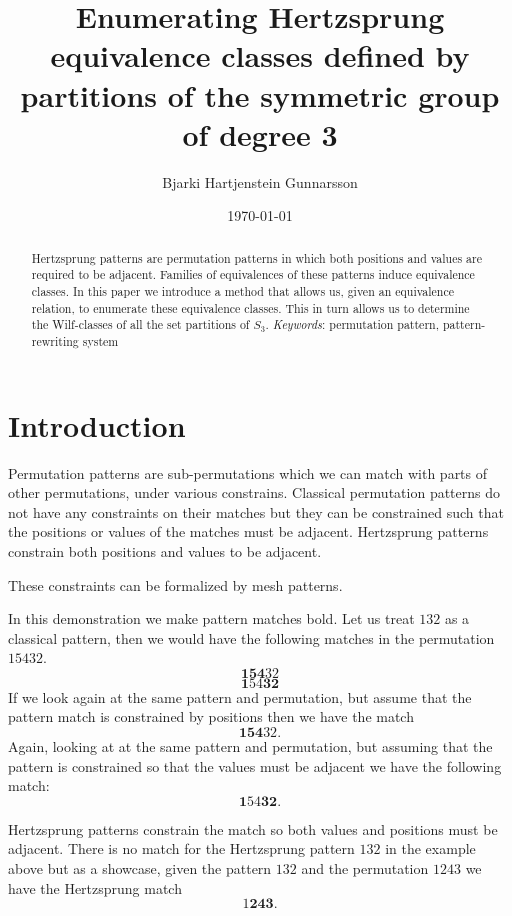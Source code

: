 \documentclass[a4paper, 11pt, english]{article}
\newcommand{\breath}{\vspace{6pt plus 2pt minus 1pt}\noindent}
\theoremstyle{definition}
\newcommand{\Sym}{S}
\begin{document}
\title{Enumerating Hertzsprung equivalence classes defined by partitions of the symmetric group of degree 3}
\author{Bjarki Hartjenstein Gunnarsson}
\date{\today}
\maketitle

\begin{abstract}
    Hertzsprung patterns are permutation patterns in which both positions and
    values are required to be adjacent. Families of equivalences of these
    patterns induce equivalence classes. In this paper we introduce a method
    that allows us, given an equivalence relation, to enumerate these
    equivalence classes. This in turn allows us to determine the Wilf-classes of
    all the set partitions of $\Sym_3$.
    \breath \emph{Keywords}: permutation pattern, pattern-rewriting system
\end{abstract}

\section{Introduction}
Permutation patterns are sub-permutations which we can match with parts of other
permutations, under various constrains. 
Classical permutation patterns do not have any constraints on their matches but they can
be constrained such that the positions or values of the matches must be adjacent.
Hertzsprung patterns constrain both positions and values to be adjacent. 

These constraints can be formalized by mesh patterns. \cite{claesson:2011}

In this demonstration we make pattern matches bold.  Let us treat $132$ as a classical
pattern, then we would have the following matches in the permutation $15432$.
\[
    \bm{154}32
\]
\[
    \bm{1}54\bm{32}
\]
If we look again at the same pattern and permutation, but assume that the
pattern match is constrained by positions then we have the match
\[
    \bm{154}32.
\]
Again, looking at at the same pattern and permutation, but assuming that the
pattern is constrained so that the values must be adjacent we have the following
match:
\[
    \bm{1}54\bm{32}.
\]

Hertzsprung patterns constrain the match so both values and positions must be
adjacent. There is no match for the Hertzsprung pattern $132$ in the example
above but as a showcase, given the pattern $132$ and the permutation $1243$ we
have the Hertzsprung match
\[
    1\bm{243}.
\]
\end{document}
